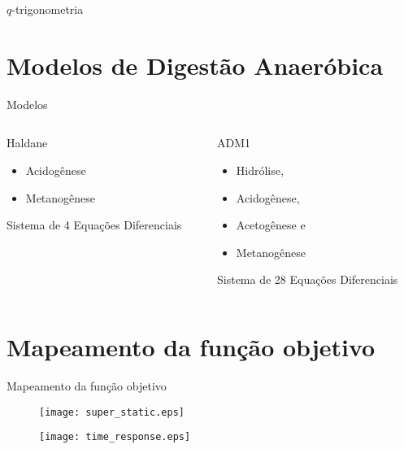 \documentclass{beamer}
\begin{document}
\begin{frame}{$q$-trigonometria}




\end{frame}



\section{Modelos de Digestão Anaeróbica}
\begin{frame}{Modelos}
\begin{columns}
\begin{column}{5cm}
\begin{block}{Haldane}
\begin{itemize}
\item Acidogênese
\item Metanogênese
\end{itemize}
Sistema de 4 Equações Diferenciais
\end{block}
\end{column}
\begin{column}{5cm}
\begin{block}{ADM1}
\begin{itemize}
\item Hidrólise, 
\item Acidogênese, 
\item Acetogênese e 
\item Metanogênese
\end{itemize}
Sistema de 28 Equações Diferenciais
\end{block}
\end{column}
\end{columns}
\end{frame}

\section{Mapeamento da função objetivo}
\begin{frame}{Mapeamento da função objetivo}
    \begin{figure}[h!]
    \centering
    \begin{minipage}{.5\columnwidth}
       \centering
       \texttt{[image: super\_static.eps]}
\label{fig:super_static}
    \end{minipage}%
    \begin{minipage}{.5\columnwidth}
       \centering
       \texttt{[image: time\_response.eps]}
       \label{response}
    \end{minipage}
    \end{figure}
\end{frame}
\end{document}

